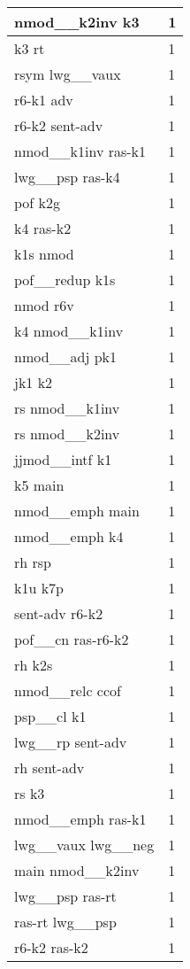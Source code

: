\documentclass[a4 paper]{article}
\begin{document}
\begin{longtable}{p{}p{}}
nmod\_\_k2inv k3  & 1 \\ \midrule
k3 rt  & 1 \\ \midrule
rsym lwg\_\_vaux  & 1 \\ \midrule
r6-k1 adv  & 1 \\ \midrule
r6-k2 sent-adv  & 1 \\ \midrule
nmod\_\_k1inv ras-k1  & 1 \\ \midrule
lwg\_\_psp ras-k4  & 1 \\ \midrule
pof k2g  & 1 \\ \midrule
k4 ras-k2  & 1 \\ \midrule
k1s nmod  & 1 \\ \midrule
pof\_\_redup k1s  & 1 \\ \midrule
nmod r6v  & 1 \\ \midrule
k4 nmod\_\_k1inv  & 1 \\ \midrule
nmod\_\_adj pk1  & 1 \\ \midrule
jk1 k2  & 1 \\ \midrule
rs nmod\_\_k1inv  & 1 \\ \midrule
rs nmod\_\_k2inv  & 1 \\ \midrule
jjmod\_\_intf k1  & 1 \\ \midrule
k5 main  & 1 \\ \midrule
nmod\_\_emph main  & 1 \\ \midrule
nmod\_\_emph k4  & 1 \\ \midrule
rh rsp  & 1 \\ \midrule
k1u k7p  & 1 \\ \midrule
sent-adv r6-k2  & 1 \\ \midrule
pof\_\_cn ras-r6-k2  & 1 \\ \midrule
rh k2s  & 1 \\ \midrule
nmod\_\_relc ccof  & 1 \\ \midrule
psp\_\_cl k1  & 1 \\ \midrule
lwg\_\_rp sent-adv  & 1 \\ \midrule
rh sent-adv  & 1 \\ \midrule
rs k3  & 1 \\ \midrule
nmod\_\_emph ras-k1  & 1 \\ \midrule
lwg\_\_vaux lwg\_\_neg  & 1 \\ \midrule
main nmod\_\_k2inv  & 1 \\ \midrule
lwg\_\_psp ras-rt  & 1 \\ \midrule
ras-rt lwg\_\_psp  & 1 \\ \midrule
r6-k2 ras-k2  & 1 \\ \midrule

\end{longtable}
\end{document}
